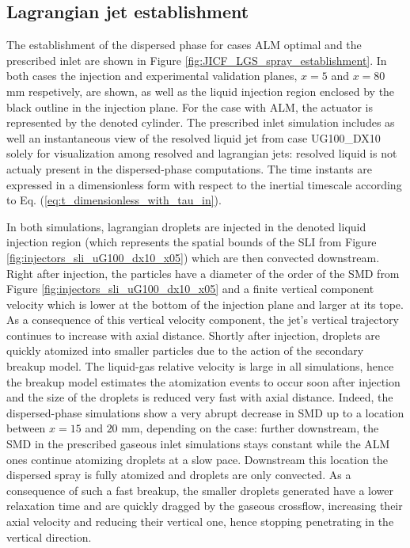 \subsection{Lagrangian jet establishment}

The establishment of the dispersed phase for cases ALM optimal and the prescribed inlet are shown in Figure \ref{fig:JICF_LGS_spray_establishment}. In both cases  the injection and experimental validation planes, $x = 5$ and $x = 80$ mm respetively, are shown, as well as the liquid injection region enclosed by the black outline in the injection plane. For the case with ALM, the actuator is represented by the denoted cylinder. The prescribed inlet simulation includes as well an instantaneous view of the resolved liquid jet from case UG100\_DX10 solely for visualization among resolved and lagrangian jets: resolved liquid is not actualy present in the dispersed-phase computations. The time instants are expressed in a dimensionless form with respect to the inertial timescale according to Eq. (\ref{eq:t_dimensionless_with_tau_in}).

In both simulations, lagrangian droplets are injected in the denoted liquid injection region (which represents the spatial bounds of the SLI from Figure \ref{fig:injectors_sli_uG100_dx10_x05}) which are then convected downstream. Right after injection, the particles have a diameter of the order of the SMD from Figure \ref{fig:injectors_sli_uG100_dx10_x05} and a finite vertical component velocity which is lower at the bottom of the injection plane and larger at its tope. As a consequence of this vertical velocity component, the jet's vertical trajectory continues to increase with axial distance. Shortly after injection, droplets are quickly atomized into smaller particles due to the action of the secondary breakup model. The liquid-gas relative velocity is large in all simulations, hence the breakup model estimates the atomization events to occur soon after injection and the size of the droplets is reduced very fast with axial distance. Indeed, the dispersed-phase simulations show a very abrupt decrease in SMD up to a location between $x = 15$ and $20$ mm, depending on the case: further downstream, the SMD in the prescribed gaseous inlet simulations stays constant while the ALM ones continue atomizing droplets at a slow pace. Downstream this location the dispersed spray is fully atomized and droplets are only convected. As a consequence of such a fast breakup, the smaller droplets generated have a lower relaxation time and are quickly dragged by the gaseous crossflow, increasing their axial velocity and reducing their vertical one, hence stopping penetrating in the vertical direction. 

